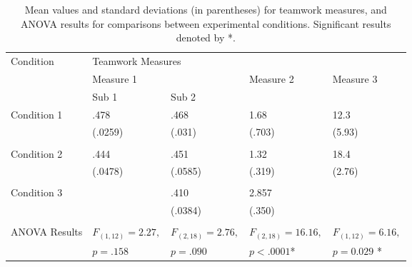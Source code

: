 \begin{center}
\begin{table*}[b!]
\small
\begin{center}
\begin{tabular}{l l l l l}
\toprule
Condition & \multicolumn{4}{l}{Teamwork Measures}\\
\cmidrule(r){2-5}
& \multicolumn{2}{l}{Measure 1} & Measure 2 & Measure 3 \\
\cmidrule(r){2-3} 
&  Sub 1 & Sub 2 &  \\ 


\midrule


Condition 1 & .478 & .468 & 1.68 & 12.3  \\
                  & (.0259) & (.031) & (.703) & (5.93) \\
\\

Condition 2 & .444 & .451 & 1.32 & 18.4 \\
                              & (.0478) & (.0585) & (.319) & (2.76) \\
\\

Condition 3 &  & .410 &  2.857 &  \\
                     &        & (.0384)  & (.350) & \\
\\


ANOVA Results & $F_{(1,12)} = 2.27,$ & $F_{(2,18)} = 2.76,$  & $F_{(2,18)} = 16.16,$ & $F_{(1,12)} = 6.16,$ \\
                          & $p = .158$ & $p = .090  $ &  $p < .0001$* &  $p = 0.029$ * \\
\bottomrule
\end{tabular}

\caption[a]{Mean values and standard deviations (in parentheses) for teamwork measures, and ANOVA results for comparisons between experimental conditions. Significant results denoted by *.}
\label{tab:exampletable}
\end{center}
\end{table*}
\end{center}
